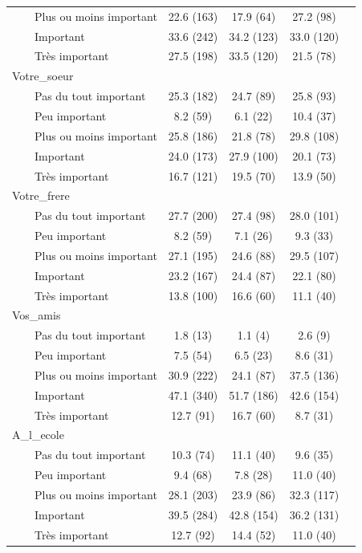 \documentclass[
]{article}
\begin{document}
\begin{table}[!t]
\begin{tabular*}{\linewidth}{@{\extracolsep{\fill}}lcccc}
    Plus ou moins important & 22.6 (163) & 17.9 (64) & 27.2 (98) &  \\ 
    Important & 33.6 (242) & 34.2 (123) & 33.0 (120) &  \\ 
    Très important & 27.5 (198) & 33.5 (120) & 21.5 (78) &  \\ 
Votre\_soeur &  &  &  &  \\ 
    Pas du tout important & 25.3 (182) & 24.7 (89) & 25.8 (93) &  \\ 
    Peu important & 8.2 (59) & 6.1 (22) & 10.4 (37) &  \\ 
    Plus ou moins important & 25.8 (186) & 21.8 (78) & 29.8 (108) &  \\ 
    Important & 24.0 (173) & 27.9 (100) & 20.1 (73) &  \\ 
    Très important & 16.7 (121) & 19.5 (70) & 13.9 (50) &  \\ 
Votre\_frere &  &  &  &  \\ 
    Pas du tout important & 27.7 (200) & 27.4 (98) & 28.0 (101) &  \\ 
    Peu important & 8.2 (59) & 7.1 (26) & 9.3 (33) &  \\ 
    Plus ou moins important & 27.1 (195) & 24.6 (88) & 29.5 (107) &  \\ 
    Important & 23.2 (167) & 24.4 (87) & 22.1 (80) &  \\ 
    Très important & 13.8 (100) & 16.6 (60) & 11.1 (40) &  \\ 
Vos\_amis &  &  &  &  \\ 
    Pas du tout important & 1.8 (13) & 1.1 (4) & 2.6 (9) &  \\ 
    Peu important & 7.5 (54) & 6.5 (23) & 8.6 (31) &  \\ 
    Plus ou moins important & 30.9 (222) & 24.1 (87) & 37.5 (136) &  \\ 
    Important & 47.1 (340) & 51.7 (186) & 42.6 (154) &  \\ 
    Très important & 12.7 (91) & 16.7 (60) & 8.7 (31) &  \\ 
A\_l\_ecole &  &  &  &  \\ 
    Pas du tout important & 10.3 (74) & 11.1 (40) & 9.6 (35) &  \\ 
    Peu important & 9.4 (68) & 7.8 (28) & 11.0 (40) &  \\ 
    Plus ou moins important & 28.1 (203) & 23.9 (86) & 32.3 (117) &  \\ 
    Important & 39.5 (284) & 42.8 (154) & 36.2 (131) &  \\ 
    Très important & 12.7 (92) & 14.4 (52) & 11.0 (40) &  \\ 

\end{tabular*}
\end{table}
\end{document}

